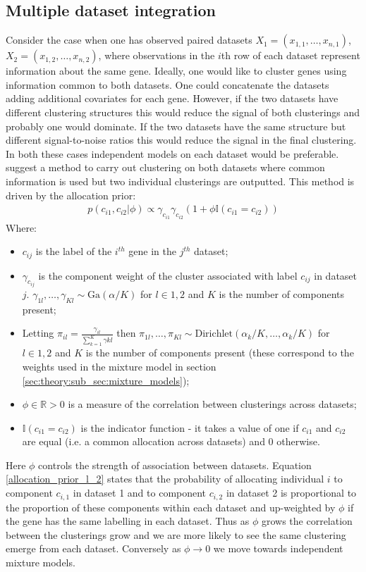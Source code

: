 \documentclass[12pt]{article} %
\begin{document}
	\subsection{Multiple dataset integration}
	Consider the case when one has observed paired datasets $X_1 = (x_{1,1},\ldots,x_{n,1})$, $X_2 = (x_{1,2},\ldots,x_{n,2})$, where observations in the $i$th row of each dataset represent information about the same gene. Ideally, one would like to cluster genes using information common to both datasets. One could concatenate the datasets adding additional covariates for each gene. However, if the two datasets have different clustering structures this would reduce the signal of both clusterings and probably one would dominate. If the two datasets have the same structure but different signal-to-noise ratios this would reduce the signal in the final clustering. In both these cases independent models on each dataset would be preferable. \citet{KirkBayesiancorrelatedclustering2012} suggest a method to carry out clustering on both datasets where common information is used but two individual clusterings are outputted. This method is driven by the allocation prior:
	\begin{align} \label{allocation_prior_l_2}
	p(c_{i1}, c_{i2} | \phi ) \propto \gamma_{c_{i1}} \gamma_{c_{i2}} (1 + \phi \mathbb{I}(c_{i1} = c_{i2}))
	\end{align}
	Where:
	\begin{itemize}
		\item $c_{ij}$ is the label of the $i^{th}$ gene in the $j^{th}$ dataset;
		\item $\gamma_{c_{ij}}$ is the component weight of the cluster associated with label $c_{ij}$ in dataset $j$. $\gamma_{1l},\ldots,\gamma_{Kl} \sim \text{Ga}(\alpha / K)$ for $l \in {1,2}$ and $K$ is the number of components present;
		\item Letting $\pi_{il} = \frac{\gamma_{il}}{\sum_{k=1}^K \gamma{kl}}$ then $\pi_{1l},\ldots,\pi_{Kl} \sim \text{Dirichlet}(\alpha_k / K, \ldots, \alpha_k / K)$ for $l \in {1,2}$ and $K$ is the number of components present (these correspond to the weights used in the mixture model in section \ref{sec:theory:sub_sec:mixture_models});
		\item $\phi \in \mathbb{R} > 0$ is a measure of the correlation between clusterings across datasets;
		\item $\mathbb{I}(c_{i1} = c_{i2})$ is the indicator function - it takes a value of one if $c_{i1}$ and $c_{i2}$ are equal (i.e. a common allocation across datasets) and 0 otherwise.
	\end{itemize}
	Here $\phi$ controls the strength of association between datasets. Equation \eqref{allocation_prior_l_2} states that the probability of allocating individual $i$ to component $c_{i,1}$ in dataset 1 and to component $c_{i,2}$ in dataset 2 is proportional to the proportion of these components within each dataset and up-weighted by $\phi$ if the gene has the same labelling in each dataset. Thus as $\phi$ grows the correlation between the clusterings grow and we are more likely to see the same clustering emerge from each dataset. Conversely as $\phi \to 0$ we move towards independent mixture models. 
	
\end{document}
